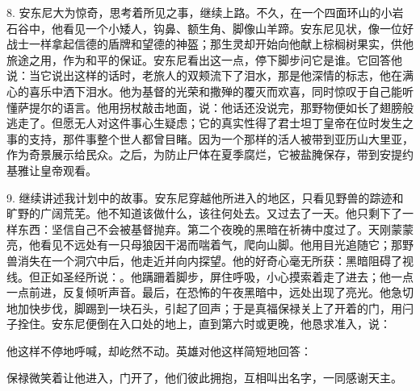 8. 安东尼大为惊奇，思考着所见之事，继续上路。不久，在一个四面环山的小岩石谷中，他看见一个小矮人，钩鼻、额生角、脚像山羊蹄。安东尼见状，像一位好战士一样拿起信德的盾牌和望德的神盔；那生灵却开始向他献上棕榈树果实，供他旅途之用，作为和平的保证。安东尼看出这一点，停下脚步问它是谁。它回答他说：当它说出这样的话时，老旅人的双颊流下了泪水，那是他深情的标志，他在满心的喜乐中洒下泪水。他为基督的光荣和撒殚的覆灭而欢喜，同时惊叹于自己能听懂萨提尔的语言。他用拐杖敲击地面，说：他话还没说完，那野物便如长了翅膀般逃走了。但愿无人对这件事心生疑虑；它的真实性得了君士坦丁皇帝在位时发生之事的支持，那件事整个世人都曾目睹。因为一个那样的活人被带到亚历山大里亚，作为奇景展示给民众。之后，为防止尸体在夏季腐烂，它被盐腌保存，带到安提约基雅让皇帝观看。\par

9. 继续讲述我计划中的故事。安东尼穿越他所进入的地区，只看见野兽的踪迹和旷野的广阔荒芜。他不知道该做什么，该往何处去。又过去了一天。他只剩下了一样东西：坚信自己不会被基督抛弃。第二个夜晚的黑暗在祈祷中度过了。天刚蒙蒙亮，他看见不远处有一只母狼因干渴而喘着气，爬向山脚。他用目光追随它；那野兽消失在一个洞穴中后，他走近并向内探望。他的好奇心毫无所获：黑暗阻碍了视线。但正如圣经所说：。他蹒跚着脚步，屏住呼吸，小心摸索着走了进去；他一点一点前进，反复倾听声音。最后，在恐怖的午夜黑暗中，远处出现了亮光。他急切地加快步伐，脚踢到一块石头，引起了回声；于是真福保禄关上了开着的门，用闩子拴住。安东尼便倒在入口处的地上，直到第六时或更晚，他恳求准入，说：\par

他这样不停地呼喊，却屹然不动。\newline{}英雄对他这样简短地回答：\par

保禄微笑着让他进入，门开了，他们彼此拥抱，互相叫出名字，一同感谢天主。\par

